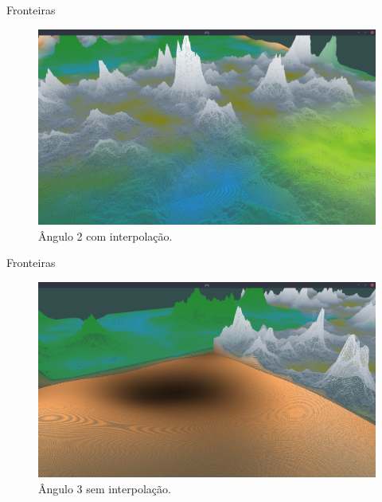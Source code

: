 \begin{frame}{Fronteiras}
    \begin{figure}[H]
        \centering
        \includegraphics[width=.9\textwidth]{img/border/a9/2c.png}
        \caption{Ângulo 2 com interpolação.}
        \label{fig:img_border_a9_2c}
    \end{figure}
    
\end{frame}

\begin{frame}{Fronteiras}
    \begin{figure}[H]
        \centering
        \includegraphics[width=.9\textwidth]{img/border/a9/3s.png}
        \caption{Ângulo 3 sem interpolação.}
        \label{fig:img_border_a9_3s}
    \end{figure}
    
\end{frame}


